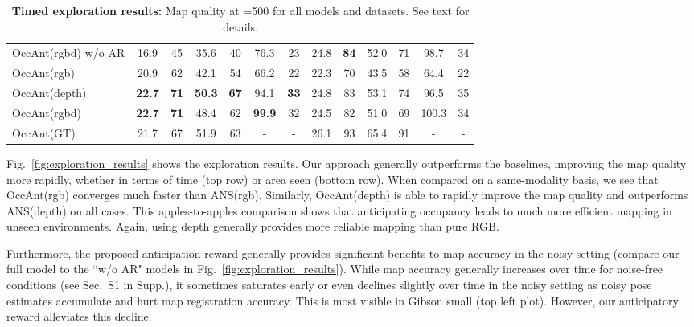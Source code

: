 \documentclass[runningheads]{llncs}
\newcommand{\tb}[1]{\textbf{#1}}
\begin{document}
\begin{table}[!t]
\begin{minipage}{\linewidth}
{\begin{tabular}{@{}lcccccccccccc@{}}
    OccAnt(rgbd) w/o AR            &     16.9           &      45        &     35.6        &     40          &     76.3         &       23        &       24.8        &   \tb{84}       &       52.0        &       71      &     98.7         &       34       \\
    OccAnt(rgb)                    &     20.9           &      62        &     42.1        &     54          &     66.2         &       22        &       22.3        &       70        &       43.5        &       58      &     64.4         &       22       \\
    OccAnt(depth)                  & \tb{22.7}          &  \tb{71}       & \tb{50.3}       & \tb{67}         &     94.1         &   \tb{33}       &       24.8        &       83        &       53.1        &       74      &     96.5         &       35       \\ 
    OccAnt(rgbd)                   & \tb{22.7}          &  \tb{71}       &     48.4        &     62          & \tb{99.9}        &       32        &       24.5        &       82        &       51.0        &       69      &    100.3         &       34       \\ \midrule
    \rowcolor{Gray} OccAnt(GT)     &     21.7           &      67        &     51.9        &     63          &       -          &         -       &       26.1        &       93        &       65.4        &       91      &       -          &       -        \\ \bottomrule
    \end{tabular}
    }
\caption{\small\textbf{Timed exploration results:} Map quality at =500 for all models and datasets. See text for details.}
\label{tab:exploration_results}
\end{minipage}\hfill
\end{table}

Fig.~\ref{fig:exploration_results} shows the exploration results. Our approach generally outperforms the baselines, improving the map quality more rapidly, whether in terms of time (top row) or area seen (bottom row). When compared on a same-modality basis, we see that OccAnt(rgb) converges much faster than ANS(rgb). Similarly, OccAnt(depth) is able to rapidly improve the map quality and outperforms ANS(depth) on all cases. This apples-to-apples comparison shows that anticipating occupancy leads to much more efficient mapping in unseen environments. Again, using depth generally provides more reliable mapping than pure RGB.

Furthermore, the proposed anticipation reward generally provides significant benefits to map accuracy in the noisy setting (compare our full model to the ``w/o AR" models in Fig.~\ref{fig:exploration_results}). While map accuracy generally increases over time for noise-free conditions (see Sec.~S1 in Supp.), it sometimes saturates early or even declines slightly over time in the noisy setting as noisy pose estimates accumulate and hurt map registration accuracy.  This is most visible in Gibson small (top left plot). However, our anticipatory reward alleviates this decline.
\end{document}
